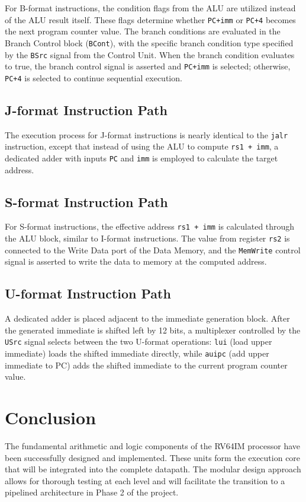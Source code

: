 \documentclass{article}
\begin{document}
For B-format instructions, the condition flags from the ALU are utilized instead of the ALU result itself. These flags determine whether \texttt{PC+imm} or \texttt{PC+4} becomes the next program counter value. The branch conditions are evaluated in the Branch Control block (\texttt{BCont}), with the specific branch condition type specified by the \texttt{BSrc} signal from the Control Unit. When the branch condition evaluates to true, the branch control signal is asserted and \texttt{PC+imm} is selected; otherwise, \texttt{PC+4} is selected to continue sequential execution.

\subsection*{J-format Instruction Path}

The execution process for J-format instructions is nearly identical to the \texttt{jalr} instruction, except that instead of using the ALU to compute \texttt{rs1 + imm}, a dedicated adder with inputs \texttt{PC} and \texttt{imm} is employed to calculate the target address.

\subsection*{S-format Instruction Path}

For S-format instructions, the effective address \texttt{rs1 + imm} is calculated through the ALU block, similar to I-format instructions. The value from register \texttt{rs2} is connected to the Write Data port of the Data Memory, and the \texttt{MemWrite} control signal is asserted to write the data to memory at the computed address.

\subsection*{U-format Instruction Path}

A dedicated adder is placed adjacent to the immediate generation block. After the generated immediate is shifted left by 12 bits, a multiplexer controlled by the \texttt{USrc} signal selects between the two U-format operations: \texttt{lui} (load upper immediate) loads the shifted immediate directly, while \texttt{auipc} (add upper immediate to PC) adds the shifted immediate to the current program counter value.

\section*{Conclusion}

The fundamental arithmetic and logic components of the RV64IM processor have been successfully designed and implemented. These units form the execution core that will be integrated into the complete datapath. The modular design approach allows for thorough testing at each level and will facilitate the transition to a pipelined architecture in Phase 2 of the project.
\end{document}
